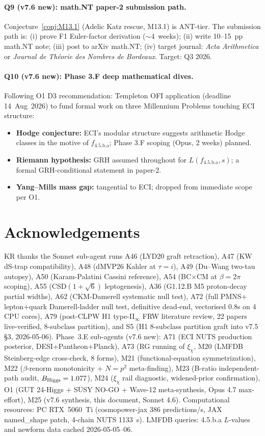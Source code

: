 \documentclass[a4paper,11pt]{article}
\newcommand{\fLM}{f_{\text{4.5.b.a}}}
\theoremstyle{definition}
\theoremstyle{remark}
\begin{document}
\paragraph{Q9 (v7.6 new): math.NT paper-2 submission path.}
Conjecture~\ref{conj:M13.1} (Adelic Katz rescue, M13.1) is
ANT-tier.  The submission path is:
(i) prove F1 Euler-factor derivation ($\sim 4$~weeks);
(ii) write 10--15~pp math.NT note;
(iii) post to arXiv math.NT;
(iv) target journal: \emph{Acta Arithmetica} or
\emph{Journal de Th\'eorie des Nombres de Bordeaux}.
Target: Q3 2026.

\paragraph{Q10 (v7.6 new): Phase 3.F deep mathematical dives.}
Following O1 D3 recommendation: Templeton OFI application
(deadline 14~Aug~2026) to fund formal work on three Millennium
Problems touching ECI structure:
\begin{itemize}
  \item \textbf{Hodge conjecture:} ECI's modular structure suggests
    arithmetic Hodge classes in the motive of $\fLM$; Phase 3.F
    scoping (Opus, 2 weeks) planned.
  \item \textbf{Riemann hypothesis:} GRH assumed throughout for
    $L(\fLM,s)$; a formal GRH-conditional statement in paper-2.
  \item \textbf{Yang--Mills mass gap:} tangential to ECI;
    dropped from immediate scope per O1.
\end{itemize}

\section*{Acknowledgements}

KR thanks the Sonnet sub-agent runs A46 (LYD20 graft retraction),
A47 (KW dS-trap compatibility), A48 (dMVP26 Kahler at $\tau=i$),
A49 (Du--Wang two-tau autopsy), A50 (Karam-Palatini Cassini
reference), A54 (BC$\times$CM at $\beta=2\pi$ scoping), A55
(CSD$(1+\sqrt 6)$ leptogenesis), A36 (G1.12.B M5
proton-decay partial widths), A62 (CKM-Damerell systematic null
test), A72 (full PMNS$+$lepton$+$quark Damerell-ladder null
test, definitive dead-end, vectorised 0.8s on 4 CPU cores),
A79 (post-CLPW H1 type-II$_\infty$ FRW literature review,
22 papers live-verified, 8-subclass partition), and
S5 (H1 8-subclass partition graft into v7.5 \S3, 2026-05-06).
Phase~3.E sub-agents (v7.6 new): A71 (ECI NUTS production
posterior, DESI+Pantheon+Planck), A73 (RG running of $\xi_\chi$,
M20 (LMFDB Steinberg-edge cross-check, 8 forms), M21
(functional-equation symmetrization), M22 ($\beta$-renorm
monotonicity + $N=p^2$ meta-finding), M23 (B-ratio
independent-path audit, $B_{\rm Higgs}=1.077$), M24 ($\xi_\chi$
rail diagnostic, widened-prior confirmation), O1 (GUT 24-Higgs +
SUSY NO-GO + Wave-12 meta-synthesis, Opus 4.7 max-effort),
M25 (v7.6 synthesis, this document, Sonnet 4.6).
Computational resources: PC RTX~5060~Ti (cosmopower-jax 386
predictions/s, JAX named\_shape patch, 4-chain NUTS 1133~s).
LMFDB queries: 4.5.b.a $L$-values and newform data cached
2026-05-05--06.
\end{document}
